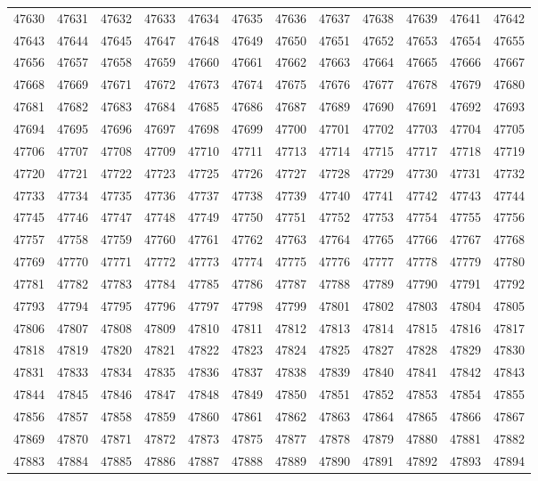 \begin{center}
\begin{longtable}{llllllllllll}
47630 &47631 &47632 &47633 &47634 &47635 &47636 &47637 &47638 &47639 &47641 &47642 \\
47643 &47644 &47645 &47647 &47648 &47649 &47650 &47651 &47652 &47653 &47654 &47655 \\
47656 &47657 &47658 &47659 &47660 &47661 &47662 &47663 &47664 &47665 &47666 &47667 \\
47668 &47669 &47671 &47672 &47673 &47674 &47675 &47676 &47677 &47678 &47679 &47680 \\
47681 &47682 &47683 &47684 &47685 &47686 &47687 &47689 &47690 &47691 &47692 &47693 \\
47694 &47695 &47696 &47697 &47698 &47699 &47700 &47701 &47702 &47703 &47704 &47705 \\
47706 &47707 &47708 &47709 &47710 &47711 &47713 &47714 &47715 &47717 &47718 &47719 \\
47720 &47721 &47722 &47723 &47725 &47726 &47727 &47728 &47729 &47730 &47731 &47732 \\
47733 &47734 &47735 &47736 &47737 &47738 &47739 &47740 &47741 &47742 &47743 &47744 \\
47745 &47746 &47747 &47748 &47749 &47750 &47751 &47752 &47753 &47754 &47755 &47756 \\
47757 &47758 &47759 &47760 &47761 &47762 &47763 &47764 &47765 &47766 &47767 &47768 \\
47769 &47770 &47771 &47772 &47773 &47774 &47775 &47776 &47777 &47778 &47779 &47780 \\
47781 &47782 &47783 &47784 &47785 &47786 &47787 &47788 &47789 &47790 &47791 &47792 \\
47793 &47794 &47795 &47796 &47797 &47798 &47799 &47801 &47802 &47803 &47804 &47805 \\
47806 &47807 &47808 &47809 &47810 &47811 &47812 &47813 &47814 &47815 &47816 &47817 \\
47818 &47819 &47820 &47821 &47822 &47823 &47824 &47825 &47827 &47828 &47829 &47830 \\
47831 &47833 &47834 &47835 &47836 &47837 &47838 &47839 &47840 &47841 &47842 &47843 \\
47844 &47845 &47846 &47847 &47848 &47849 &47850 &47851 &47852 &47853 &47854 &47855 \\
47856 &47857 &47858 &47859 &47860 &47861 &47862 &47863 &47864 &47865 &47866 &47867 \\
47869 &47870 &47871 &47872 &47873 &47875 &47877 &47878 &47879 &47880 &47881 &47882 \\
47883 &47884 &47885 &47886 &47887 &47888 &47889 &47890 &47891 &47892 &47893 &47894 \\

\end{longtable}
\end{center}
